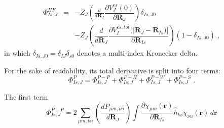 \begin{eqnarray}
\Phi_{Is,J}^{HF} & = & -Z_{J}\left(\frac{d}{d\mathbf{R}_J}\dfrac{\partial V^{es}_{J}(0)} {\partial \mathbf{R}_{J} }\right) \delta_{Is,J0}\\ && - Z_J\left(\dfrac{d}{d\mathbf{R}_{J}} \dfrac{\partial V^{es,tot}_{I}(|\mathbf{R}_{J}-\mathbf{R}_{Is}) |} {\partial \mathbf{R}_{Is} }  \right) \left(1-\delta_{Is,J0}\right)\;,\nonumber
\end{eqnarray}
in which $\delta_{Is,J0} = \delta_{IJ}\delta_{s0}$ denotes
a multi-index Kronecker delta. 

For the sake of readability, its total derivative is split into four terms:
\begin{equation}
\Phi_{Is,J}^{P} = \Phi_{Is,J}^{P-P} + \Phi_{Is,J}^{P-H} + \Phi_{Is,J}^{P-W} + \Phi_{Is,J}^{P-S}\;.
\end{equation}


The first term
\begin{equation}
\Phi_{Is,J}^{P-P} =  {2} \sum_{\mu m,\nu n} 
\left( \frac{d P_{\mu m,\nu n}}{d \mathbf{R}_{J}}\right)
\int  \dfrac{\partial \chi_{\mu m}(\mathbf{r})}{\partial  \mathbf{R}_{Is} }\hat{h}_{ks} \chi_{\nu n}(\mathbf{r}) \, d\mathbf{r}
\end{equation}

